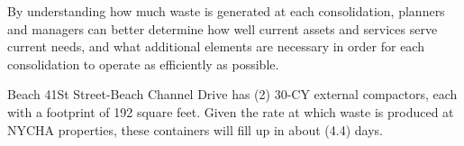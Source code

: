 
    By understanding how much waste is generated at each consolidation, planners and managers
    can better determine how well current assets and services serve current needs, and what additional 
    elements are necessary in order for each consolidation to operate as efficiently as possible. 

    Beach 41St Street-Beach Channel Drive has (2) 30-CY external compactors, each with a footprint of 192 square feet. Given the rate at which waste is produced at NYCHA properties, these containers will fill
    up in about (4.4) days.